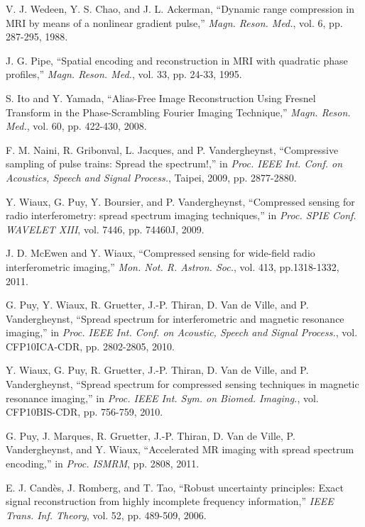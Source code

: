 \documentclass[10pt,draftcls, onecolumn]{IEEEtran}
\begin{document}
\begin{thebibliography}{}
V. J. Wedeen, Y. S. Chao, and J. L. Ackerman, ``Dynamic range compression in MRI by means of a nonlinear gradient pulse,'' \emph{Magn. Reson. Med.}, vol. 6, pp. 287-295, 1988.

J. G. Pipe, ``Spatial encoding and reconstruction in MRI with quadratic phase profiles,'' \emph{Magn. Reson. Med.}, vol. 33, pp. 24-33, 1995.

S. Ito and Y. Yamada, ``Alias-Free Image Reconstruction Using Fresnel Transform in the Phase-Scrambling Fourier Imaging Technique,'' \emph{Magn. Reson. Med.}, vol. 60, pp. 422-430, 2008.

F. M. Naini, R. Gribonval, L. Jacques, and P. Vandergheynst, ``Compressive sampling of pulse trains: Spread the spectrum!,'' in \emph{Proc. IEEE Int. Conf. on Acoustics, Speech and Signal Process.}, Taipei, 2009, pp. 2877-2880.

Y. Wiaux, G. Puy, Y. Boursier, and P. Vandergheynst, ``Compressed sensing for radio interferometry: spread spectrum imaging techniques,'' in \emph{Proc. SPIE Conf. WAVELET XIII}, vol. 7446,  pp. 74460J, 2009.

J. D. McEwen and Y. Wiaux, ``Compressed sensing for wide-field radio interferometric imaging,'' \emph{Mon. Not. R. Astron. Soc.}, vol. 413, pp.1318-1332, 2011.

G. Puy, Y. Wiaux, R.  Gruetter, J.-P. Thiran, D. Van de Ville, and P. Vandergheynst, ``Spread spectrum for interferometric and magnetic resonance imaging,'' in \emph{Proc. IEEE Int. Conf. on Acoustic, Speech and Signal Process.}, vol. CFP10ICA-CDR, pp. 2802-2805, 2010.

Y. Wiaux, G. Puy, R.  Gruetter, J.-P. Thiran, D. Van de Ville, and P. Vandergheynst, ``Spread spectrum for compressed sensing techniques in magnetic resonance imaging,'' in \emph{Proc. IEEE Int. Sym. on Biomed. Imaging.}, vol. CFP10BIS-CDR,  pp. 756-759, 2010.

G. Puy, J. Marques, R.  Gruetter, J.-P. Thiran, D. Van de Ville, P. Vandergheynst, and Y. Wiaux, ``Accelerated MR imaging with spread spectrum encoding,'' in \emph{Proc. ISMRM}, pp. 2808, 2011.

E. J. Cand\`{e}s, J. Romberg, and T. Tao, ``Robust uncertainty principles: Exact signal reconstruction from highly incomplete frequency information,'' \emph{IEEE Trans. Inf. Theory}, vol. 52, pp. 489-509, 2006.


\end{thebibliography}
\end{document}
